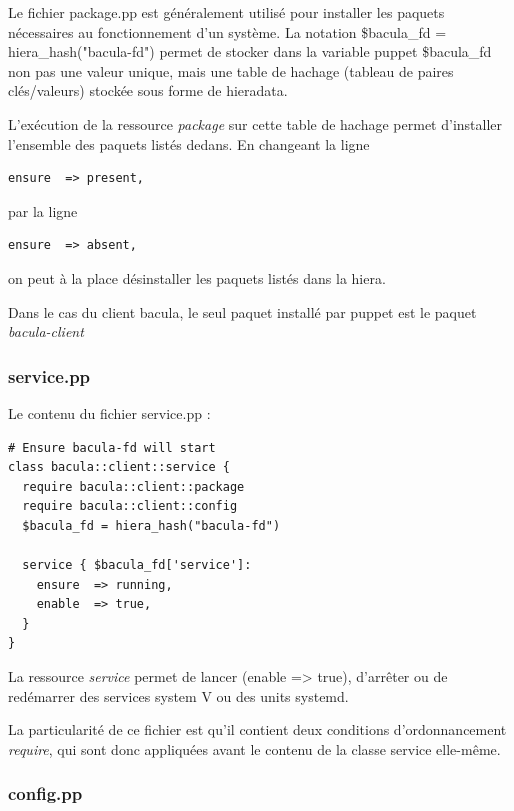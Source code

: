 \documentclass[14 pt]{extreport}
\begin{document}
Le fichier package.pp est généralement utilisé pour installer les paquets nécessaires au fonctionnement d'un système. La notation \$bacula\_fd = hiera\_hash("bacula-fd") permet de stocker dans la variable puppet \$bacula\_fd non pas une valeur unique, mais une table de hachage (tableau de paires clés/valeurs) stockée sous forme de hieradata.

L'exécution de la ressource \emph{package} sur cette table de hachage permet d'installer l'ensemble des paquets listés dedans. En changeant la ligne
\begin{Verbatim}[fontsize=\scriptsize]
    ensure  => present,
\end{Verbatim}

par la ligne

\begin{Verbatim}[fontsize=\scriptsize]
    ensure  => absent,
\end{Verbatim}
on peut à la place désinstaller les paquets listés dans la hiera.

Dans le cas du client bacula, le seul paquet installé par puppet est le paquet \emph{bacula-client}

\subsubsection*{service.pp}

Le contenu du fichier service.pp :

\begin{framed}
\begin{Verbatim}[fontsize=\scriptsize]
# Ensure bacula-fd will start
class bacula::client::service {
  require bacula::client::package
  require bacula::client::config
  $bacula_fd = hiera_hash("bacula-fd")

  service { $bacula_fd['service']:
    ensure  => running,
    enable  => true,
  }
}\end{Verbatim}
\end{framed}

La ressource \emph{service} permet de lancer (enable => true), d'arrêter ou de redémarrer des services system V ou des units systemd.

La particularité de ce fichier est qu'il contient deux conditions d'ordonnancement \emph{require}, qui sont donc appliquées avant le contenu de la classe service elle-même.

\subsubsection*{config.pp}
\end{document}
